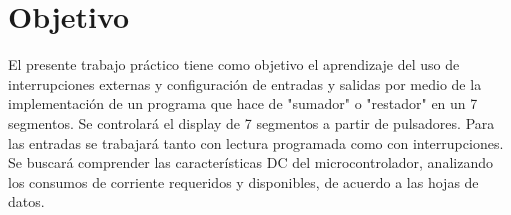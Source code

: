 \section{Objetivo}
El presente trabajo práctico tiene como objetivo el aprendizaje del uso de interrupciones externas y configuración de entradas y salidas por medio de la implementación de un programa que hace de "sumador" o "restador" en un 7 segmentos.
Se controlará el display de 7 segmentos a partir de pulsadores. Para las entradas se trabajará tanto con lectura programada como con interrupciones. Se buscará comprender las características DC del microcontrolador, analizando los consumos de corriente requeridos y disponibles, de acuerdo a las hojas de datos.